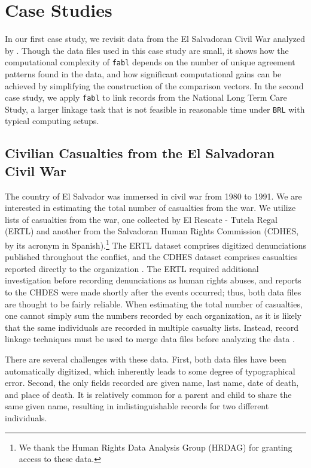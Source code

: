 \documentclass[ba]{imsart}
\begin{document}
	\section{Case Studies}
	\label{sec:case-studies}
	
	In our first case study, we revisit data from the El Salvadoran Civil War analyzed by \cite{sadinle_bayesian_2017}. Though the data files used in this case study are small, it shows how the computational complexity of \texttt{fabl} depends on the number of unique agreement patterns found in the data, and how significant computational gains can be achieved by simplifying the construction of the comparison vectors. In the second case study, we apply \texttt{fabl} to link records from the National Long Term Care Study, a larger linkage task that is not feasible in reasonable time under \texttt{BRL} with typical computing setups. 
	
	\subsection{Civilian Casualties from the El Salvadoran Civil War}
	\label{el_salvador}
	
	The country of El Salvador was immersed in civil war from 1980 to 1991. We are interested in estimating the total number of casualties from the war. We utilize lists of casualties from the war, one collected by El Rescate - Tutela Regal (ERTL) and another from the Salvadoran Human Rights Commission (CDHES, by its acronym in Spanish).\footnote{We thank the Human Rights Data Analysis Group (HRDAG) for granting access to these data.} The ERTL dataset comprises digitized denunciations published throughout the conflict, and the CDHES dataset comprises casualties reported directly to the organization \citep{howland2008rescate, ball2000salvadoran}. The ERTL required additional investigation before recording denunciations as human rights abuses, and reports to the CHDES were made shortly after the events occurred; thus, both data files are thought to be fairly reliable. When estimating the total number of casualties, one cannot simply sum the numbers recorded by each organization, as it is likely that the same individuals are recorded in multiple casualty lists. Instead, record linkage techniques must be used to merge data files before analyzing the data \citep{lum2013applications}. 
	
	There are several challenges with these data. First, both data files have been automatically digitized, which inherently leads to some degree of typographical error. Second, the only fields recorded are given name, last name, date of death, and place of death. It is relatively common for a parent and child to share the same given name, resulting in indistinguishable records for two different individuals. 
	
\end{document}
